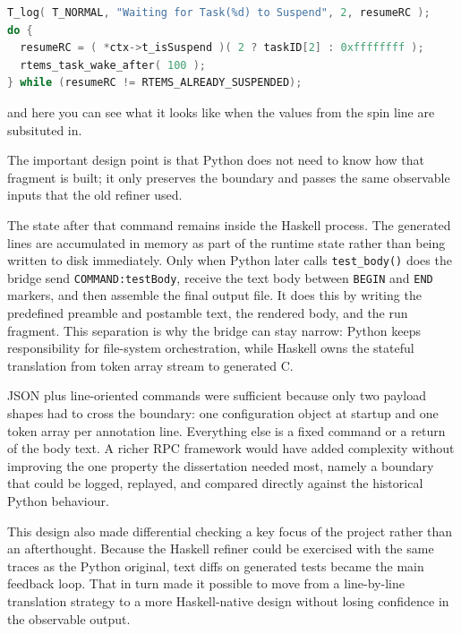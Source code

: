 \begin{lstlisting}[language=C, caption={Generated C after template substitution}, label={lst:waitforsuspend-generated}]
T_log( T_NORMAL, "Waiting for Task(%d) to Suspend", 2, resumeRC );
do {
  resumeRC = ( *ctx->t_isSuspend )( 2 ? taskID[2] : 0xffffffff );
  rtems_task_wake_after( 100 );
} while (resumeRC != RTEMS_ALREADY_SUSPENDED);
\end{lstlisting}

and here you can see what it looks like when the values from the spin line are subsituted in.

The important design point is that Python does not need to know how that fragment is built;
it only preserves the boundary and passes the same observable inputs
that the old refiner used.

The state after that command remains inside the Haskell process. The
generated lines are accumulated in memory as part of the runtime state
rather than being written to disk immediately. Only when Python later
calls \texttt{test\_body()} does the bridge send
\texttt{COMMAND:testBody}, receive the text body between
\texttt{BEGIN} and \texttt{END} markers, and then assemble the final
output file. It does this by writing the predefined preamble and postamble text, the rendered body, and the run fragment. This separation is why the bridge can
stay narrow: Python keeps responsibility for file-system
orchestration, while Haskell owns the stateful translation from
token array stream to generated C.

JSON plus line-oriented commands were sufficient because only two
payload shapes had to cross the boundary: one configuration object at
startup and one token array per annotation line. Everything else is a
fixed command or a return of the body text. A richer RPC framework would have
added complexity without improving the one property the dissertation
needed most, namely a boundary that could be logged, replayed, and
compared directly against the historical Python behaviour.

This design also made differential checking a key focus of the project rather than an afterthought. Because the Haskell refiner could be exercised with the same traces as the Python original, text diffs on generated tests became the main feedback loop. That in turn made it possible to move from a line-by-line translation strategy to a more Haskell-native design without losing confidence in the observable output.

